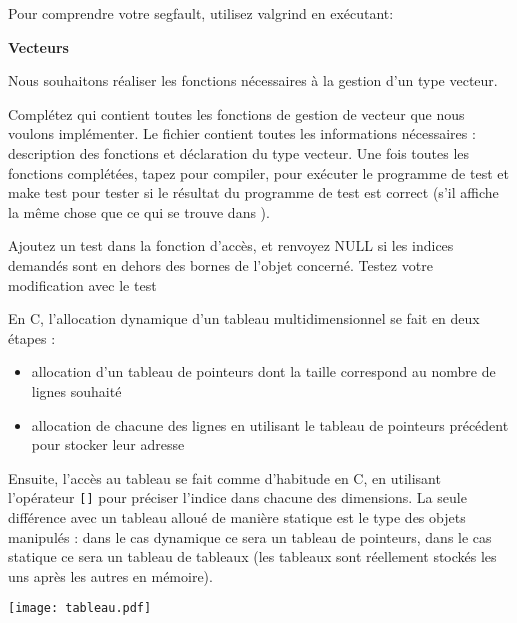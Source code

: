 \documentclass[10pt]{article}\usepackage[enonce]{exemptty}
\begin{document}
Pour comprendre votre segfault, utilisez valgrind en exécutant:

\begin{Exercice} \textbf{Vecteurs}

  Nous souhaitons réaliser les fonctions nécessaires à la gestion d'un type
  vecteur.

  \Question Complétez  qui contient toutes les
  fonctions de gestion de vecteur que nous voulons implémenter. Le
  fichier  contient toutes les informations
  nécessaires : description des fonctions et déclaration du type
  vecteur. Une fois toutes les fonctions complétées, tapez  pour compiler,  pour exécuter le
  programme de test et make test pour tester si le résultat du
  programme de test est correct (s'il affiche la même chose que ce qui
  se trouve dans ).

  \Question Ajoutez un test dans la fonction d'accès, et renvoyez NULL
  si les indices demandés sont en dehors des bornes de l'objet
  concerné. Testez votre modification avec le test 
\end{Exercice}

 En C, l'allocation dynamique d'un tableau
multidimensionnel se fait
en deux étapes :\\
\begin{minipage}{.5\linewidth}
  \begin{itemize}
  \item allocation d'un tableau de pointeurs dont la taille correspond au
    nombre de lignes souhaité
  \item allocation de chacune des lignes en utilisant le tableau de pointeurs
    précédent pour stocker leur adresse
  \end{itemize}

  Ensuite, l'accès au tableau se fait comme d'habitude en C, en utilisant
  l'opérateur \verb~[]~ pour préciser l'indice dans chacune des dimensions. La seule
  différence avec un tableau alloué de manière statique est le type des objets
  manipulés : dans le cas dynamique ce sera un tableau de pointeurs, dans le
  cas statique ce sera un tableau de tableaux (les tableaux sont réellement
  stockés les uns après les autres en mémoire).

\end{minipage}\hfill\begin{minipage}{.48\linewidth}
  \texttt{[image: tableau.pdf]}
\end{minipage}
\end{document}
